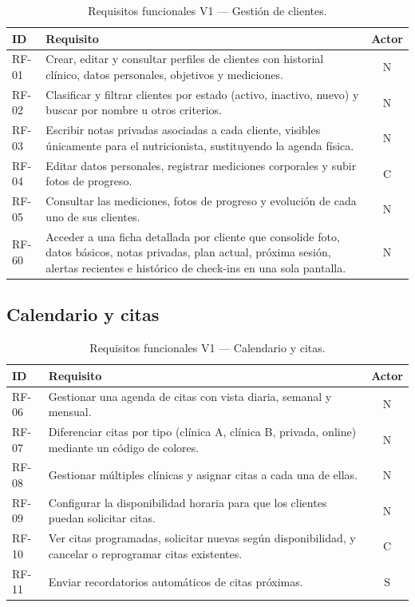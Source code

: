 \begin{table}[htbp]
\centering
\small
\begin{tabular}{|l|p{10.5cm}|c|}
\hline
\textbf{ID} & \textbf{Requisito} & \textbf{Actor} \\
\hline
RF-01 & Crear, editar y consultar perfiles de clientes con historial clínico, datos personales, objetivos y mediciones. & N \\
\hline
RF-02 & Clasificar y filtrar clientes por estado (activo, inactivo, nuevo) y buscar por nombre u otros criterios. & N \\
\hline
RF-03 & Escribir notas privadas asociadas a cada cliente, visibles únicamente para el nutricionista, sustituyendo la agenda física. & N \\
\hline
RF-04 & Editar datos personales, registrar mediciones corporales y subir fotos de progreso. & C \\
\hline
RF-05 & Consultar las mediciones, fotos de progreso y evolución de cada uno de sus clientes. & N \\
\hline
RF-60 & Acceder a una ficha detallada por cliente que consolide foto, datos básicos, notas privadas, plan actual, próxima sesión, alertas recientes e histórico de check-ins en una sola pantalla. & N \\
\hline
\end{tabular}
\caption{Requisitos funcionales V1 --- Gestión de clientes.}
\label{tab:rf-clientes-v1}
\end{table}

\subsection{Calendario y citas}

\begin{table}[htbp]
\centering
\small
\begin{tabular}{|l|p{10.5cm}|c|}
\hline
\textbf{ID} & \textbf{Requisito} & \textbf{Actor} \\
\hline
RF-06 & Gestionar una agenda de citas con vista diaria, semanal y mensual. & N \\
\hline
RF-07 & Diferenciar citas por tipo (clínica A, clínica B, privada, online) mediante un código de colores. & N \\
\hline
RF-08 & Gestionar múltiples clínicas y asignar citas a cada una de ellas. & N \\
\hline
RF-09 & Configurar la disponibilidad horaria para que los clientes puedan solicitar citas. & N \\
\hline
RF-10 & Ver citas programadas, solicitar nuevas según disponibilidad, y cancelar o reprogramar citas existentes. & C \\
\hline
RF-11 & Enviar recordatorios automáticos de citas próximas. & S \\
\hline
\end{tabular}
\caption{Requisitos funcionales V1 --- Calendario y citas.}
\label{tab:rf-calendario-v1}
\end{table}


